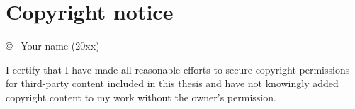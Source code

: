 \section*{Copyright notice}

\vspace{1cm}

{
  \copyright ~ Your name (20xx)
}

\vspace{1cm}

{
  I certify that I have made all reasonable efforts to secure
  copyright permissions for third-party content included in this
  thesis and have not knowingly added copyright content to my work
  without the owner's permission.
}
